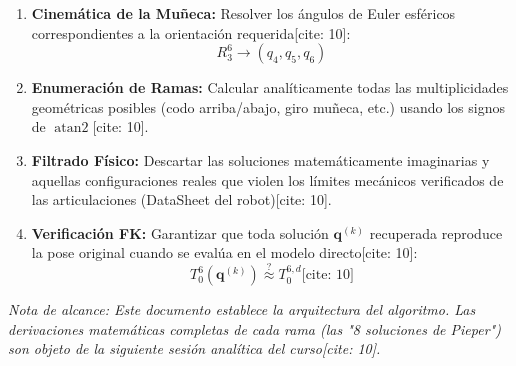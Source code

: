 \documentclass[11pt, a4paper]{article}
\begin{document}
\begin{tcolorbox}[colback=gray!5, colframe=ucbblue, title=\textbf{Flujo del Algoritmo Analítico}, fonttitle=\large\bfseries]
\begin{enumerate}
        \item \textbf{Cinemática de la Muñeca:} Resolver los ángulos de Euler esféricos correspondientes a la orientación requerida[cite: 10]:
        \begin{equation*}
            R_3^6 \longrightarrow (q_4, q_5, q_6)
        \end{equation*}
        
        \item \textbf{Enumeración de Ramas:} Calcular analíticamente todas las multiplicidades geométricas posibles (codo arriba/abajo, giro muñeca, etc.) usando los signos de $\operatorname{atan2}$[cite: 10].
        
        \item \textbf{Filtrado Físico:} Descartar las soluciones matemáticamente imaginarias y aquellas configuraciones reales que violen los límites mecánicos verificados de las articulaciones (DataSheet del robot)[cite: 10].
        
        \item \textbf{Verificación FK:} Garantizar que toda solución $\mathbf{q}^{(k)}$ recuperada reproduce la pose original cuando se evalúa en el modelo directo[cite: 10]:
        \begin{equation*}
            T_0^6(\mathbf{q}^{(k)}) \stackrel{?}{\approx} T_0^{6,d} \text{[cite: 10]}
        \end{equation*}
    \end{enumerate}
\end{tcolorbox}

\vspace{0.5cm}
\noindent \textit{Nota de alcance: Este documento establece la arquitectura del algoritmo. Las derivaciones matemáticas completas de cada rama (las "8 soluciones de Pieper") son objeto de la siguiente sesión analítica del curso[cite: 10].}
\end{document}
